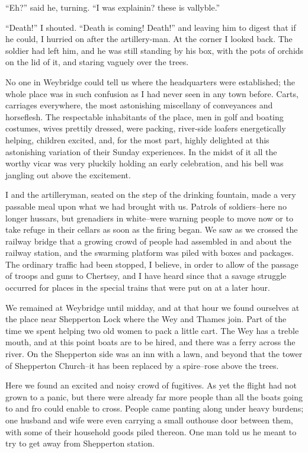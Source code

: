 ``Eh?'' said he, turning. ``I was explainin? these is vallyble.''

``Death!'' I shouted. ``Death is coming! Death!'' and leaving him to
digest that if he could, I hurried on after the artillery-man. At
the corner I looked back. The soldier had left him, and he was
still standing by his box, with the pots of orchids on the lid of
it, and staring vaguely over the trees.

No one in Weybridge could tell us where the headquarters were
established; the whole place was in such confusion as I had never
seen in any town before. Carts, carriages everywhere, the most
astonishing miscellany of conveyances and horseflesh. The
respectable inhabitants of the place, men in golf and boating
costumes, wives prettily dressed, were packing, river-side loafers
energetically helping, children excited, and, for the most part,
highly delighted at this astonishing variation of their Sunday
experiences. In the midst of it all the worthy vicar was very
pluckily holding an early celebration, and his bell was jangling
out above the excitement.

I and the artilleryman, seated on the step of the drinking
fountain, made a very passable meal upon what we had brought with
us. Patrols of soldiers--here no longer hussars, but grenadiers in
white--were warning people to move now or to take refuge in their
cellars as soon as the firing began. We saw as we crossed the
railway bridge that a growing crowd of people had assembled in and
about the railway station, and the swarming platform was piled with
boxes and packages. The ordinary traffic had been stopped, I
believe, in order to allow of the passage of troops and guns to
Chertsey, and I have heard since that a savage struggle occurred
for places in the special trains that were put on at a later hour.

We remained at Weybridge until midday, and at that hour we found
ourselves at the place near Shepperton Lock where the Wey and
Thames join. Part of the time we spent helping two old women to
pack a little cart. The Wey has a treble mouth, and at this point
boats are to be hired, and there was a ferry across the river. On
the Shepperton side was an inn with a lawn, and beyond that the
tower of Shepperton Church--it has been replaced by a spire--rose
above the trees.

Here we found an excited and noisy crowd of fugitives. As yet the
flight had not grown to a panic, but there were already far more
people than all the boats going to and fro could enable to cross.
People came panting along under heavy burdens; one husband and wife
were even carrying a small outhouse door between them, with some of
their household goods piled thereon. One man told us he meant to
try to get away from Shepperton station.

